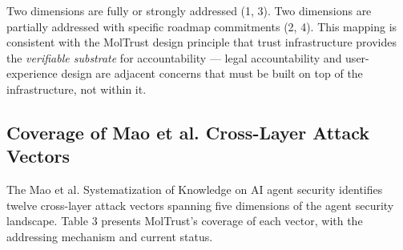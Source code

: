 Two dimensions are fully or strongly addressed (1, 3). Two dimensions are partially addressed with specific roadmap commitments (2, 4). This mapping is consistent with the MolTrust design principle that trust infrastructure provides the \textit{verifiable substrate} for accountability — legal accountability and user-experience design are adjacent concerns that must be built on top of the infrastructure, not within it.


\subsection{Coverage of Mao et al. Cross-Layer Attack Vectors}

The Mao et al. Systematization of Knowledge on AI agent security \cite{ref20_mao} identifies twelve cross-layer attack vectors spanning five dimensions of the agent security landscape. Table 3 presents MolTrust's coverage of each vector, with the addressing mechanism and current status.




